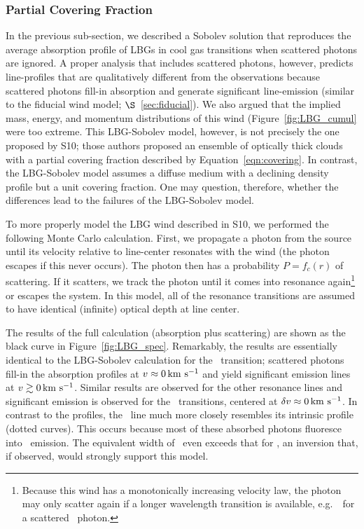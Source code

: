 \documentclass[12pt,preprint]{aastex}
\begin{document}
\subsubsection{Partial Covering Fraction}
\label{sec:Covering}

In the previous sub-section, we described a Sobolev solution that
reproduces the average absorption profile of LBGs in cool gas
transitions when scattered photons are ignored.  A proper analysis
that includes scattered photons,
however, predicts line-profiles that are qualitatively
different from the observations because scattered photons fill-in
absorption and generate significant line-emission (similar to the
fiducial wind model; $\S$~\ref{sec:fiducial}).
We also argued that the implied mass, energy, and momentum
distributions of this wind (Figure~\ref{fig:LBG_cumul} were too
extreme. 
This LBG-Sobolev model, however, is not precisely
the one proposed by S10;  those authors proposed an ensemble of optically
thick clouds with a partial covering fraction described by
Equation~\ref{eqn:covering}.  In contrast, the LBG-Sobolev model assumes
a diffuse medium with a declining density profile but a unit covering
fraction.  One may question, therefore,  whether the differences
lead to the failures of the LBG-Sobolev model. 

To more properly model the LBG wind described in S10, we 
performed the following Monte Carlo calculation.  First, we propagate
a photon from the source until its velocity relative to line-center
resonates with the wind (the photon escapes if this never occurs).
The photon then has a probability $P = f_c(r)$ of scattering.  If it
scatters, we track the photon until it comes into
resonance again\footnote{Because this wind has a monotonically
  increasing velocity law, the photon may only scatter again if a
  longer wavelength transition is available, e.g.\ \mgiib\ for a
  scattered \mgiia\ photon.} or escapes the system.  In this model, all of the
resonance transitions are assumed to have identical (infinite) optical
depth at line center. 

The results of the full calculation (absorption plus scattering) are
shown as the black curve in Figure~\ref{fig:LBG_spec}.  Remarkably, the results
are essentially identical to the LBG-Sobolev calculation for the
\mgiia\ transition; scattered photons fill-in
the absorption profiles at $v \approx 0 \, {\rm km~s^{-1}}$ and yield significant
emission lines at $v \gtrsim 0 \, {\rm km~s^{-1}}$. 
Similar results are observed for the other resonance lines and  
significant emission is observed 
for the \feiis\ transitions, centered at $\delta v \approx 0 \, {\rm km~s^{-1}}$.  
In contrast to the  profiles, the 
\feiia\ line much more closely resembles its intrinsic
profile (dotted curves).  This occurs because most of these
absorbed photons fluoresce into \feiis\ emission.
The equivalent width of \feiia\ even exceeds that for \feiib, an
inversion that, if observed, would strongly support this model.
\end{document}
